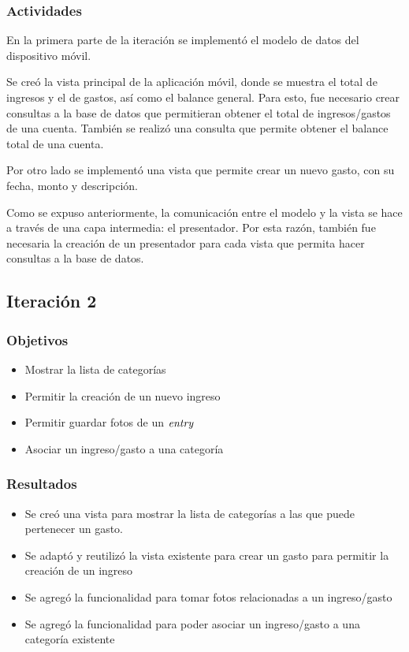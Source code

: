 \subsubsection{Actividades}
En la primera parte de la iteración se implementó el modelo de datos del dispositivo móvil.

Se creó la vista principal de la aplicación móvil, donde se muestra el total de ingresos y el de gastos, así como el balance general. Para esto, fue necesario crear consultas a la base de datos que permitieran obtener el total de ingresos/gastos de una cuenta.  También se realizó una consulta que permite obtener el balance total de una cuenta.

Por otro lado se implementó una vista que permite crear un nuevo gasto, con su fecha, monto y descripción.

Como se expuso anteriormente, la comunicación entre el modelo y la vista se hace a través de una capa intermedia: el presentador. Por esta razón, también fue necesaria la creación de un presentador para cada vista que permita hacer consultas a la base de datos.

\subsection{Iteración 2}

\subsubsection{Objetivos}
\begin{itemize}
\item Mostrar la lista de categorías
\item Permitir la creación de un nuevo ingreso
\item Permitir guardar fotos de un $\textit{entry}$
\item Asociar un ingreso/gasto a una categoría
\end{itemize}

\subsubsection{Resultados}
\begin{itemize}
\item Se creó una vista para mostrar la lista de categorías a las que puede pertenecer un gasto.
\item Se adaptó y reutilizó la vista existente para crear un gasto para permitir la creación de un ingreso
\item Se agregó la funcionalidad para tomar fotos relacionadas a un ingreso/gasto
\item Se agregó la funcionalidad para poder asociar un ingreso/gasto a una categoría existente

\end{itemize}

